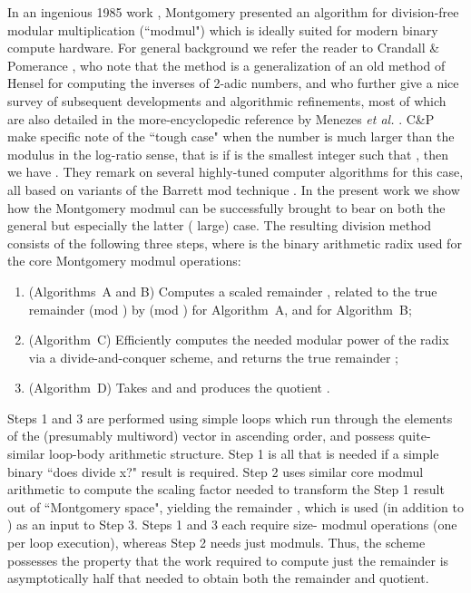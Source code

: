 \documentclass{article}
\begin{document}
In an ingenious 1985 work \cite{Mont85}, Montgomery presented an algorithm for division-free modular multiplication (``modmul") which is ideally suited for modern binary compute hardware. For general background we refer the reader to Crandall \& Pomerance \cite{CP05}, who note that the method is a generalization of an old method of Hensel \cite{Hensel} for computing the inverses of 2-adic numbers, and who further give a nice survey of subsequent developments and algorithmic refinements, most of which are also detailed in the more-encyclopedic reference by Menezes {\em et al.} \cite{Mene96}. C\&P make specific note of the ``tough case" when the number  is much larger than the modulus  in the log-ratio sense, that is if  is the smallest integer such that , then we have . They remark on several highly-tuned computer algorithms for this case, all based on variants of the Barrett mod technique \cite{Bar87}. In the present work we show how the Montgomery modmul can be successfully brought to bear on both the general but especially the latter ( large) case. The resulting division method consists of the following three steps, where  is the binary arithmetic radix used for the core Montgomery modmul operations:
\begin{enumerate}
\item 	(Algorithms~A and B) Computes a scaled remainder , related to the true remainder  (mod ) by  (mod ) for Algorithm~A, and  for Algorithm~B;

\item	(Algorithm~C) Efficiently computes the needed modular power of the radix  via a divide-and-conquer scheme, and returns the true remainder ;

\item	(Algorithm~D) Takes  and  and produces the quotient .
\end{enumerate}
Steps 1 and 3 are performed using simple loops which run through the elements of the (presumably multiword) vector  in ascending order, and possess quite-similar loop-body arithmetic structure. Step 1 is all that is needed if a simple binary ``does  divide x?" result is required. Step 2 uses similar core modmul arithmetic to compute the scaling factor needed to transform the Step 1 result out of ``Montgomery space", yielding the remainder , which is used (in addition to ) as an input to Step 3. Steps 1 and 3 each require  size- modmul operations (one per loop execution), whereas Step 2 needs just  modmuls. Thus, the scheme possesses the property that the work required to compute just the remainder  is asymptotically half that needed to obtain both the remainder and quotient.
\end{document}
